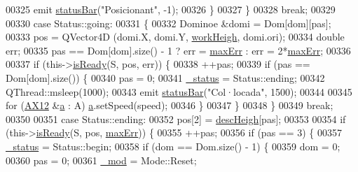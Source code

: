 \begin{DoxyCode}
00325                     emit \hyperlink{a00009_a3a3adc795d88624f86e13f2525e41106}{statusBar}(\textcolor{stringliteral}{"Posicionant"}, -1);
00326                 \}
00327             \}
00328                 \textcolor{keywordflow}{break};
00329                 
00330             \textcolor{keywordflow}{case} Status::going:
00331             \{
00332                 Dominoe &domi = Dom[dom][pas];
00333                 pos = QVector4D (domi.X, domi.Y, \hyperlink{a00009_a53758fdbbee450ab4cd5a3432725f056}{workHeigh}, domi.ori);
00334                 \textcolor{keywordtype}{double} err;
00335                 pas == Dom[dom].size() - 1 ? err = \hyperlink{a00009_a3ecb7da23afe91883435f239bd08ceb3}{maxErr} : err = 2*\hyperlink{a00009_a3ecb7da23afe91883435f239bd08ceb3}{maxErr};
00336                 
00337                 \textcolor{keywordflow}{if} (this->\hyperlink{a00009_a1d96ca800864243478463b0306ed74d7}{isReady}(S, pos, err)) \{
00338                     ++pas;
00339                     \textcolor{keywordflow}{if} (pas == Dom[dom].size()) \{
00340                         pas = 0;
00341                         \hyperlink{a00009_a8d2299f41165bffe1656df776f7f7528}{\_status} = Status::ending;
00342                         QThread::msleep(1000);
00343                         emit \hyperlink{a00009_a3a3adc795d88624f86e13f2525e41106}{statusBar}(\textcolor{stringliteral}{"Col·locada"}, 1500);
00344                         
00345                         \textcolor{keywordflow}{for} (\hyperlink{a00001}{AX12} &\hyperlink{a00009_a7dc3998d380d61406fe4485f9872edff}{a} : A) \hyperlink{a00009_a7dc3998d380d61406fe4485f9872edff}{a}.setSpeed(speed);
00346                     \}
00347                 \}
00348             \}   
00349                 \textcolor{keywordflow}{break};
00350                 
00351             \textcolor{keywordflow}{case} Status::ending:
00352                 pos[2] = \hyperlink{a00009_a9ca211d5d711c959689afd7fff5a897a}{descHeigh}[pas];
00353                 
00354                 \textcolor{keywordflow}{if} (this->\hyperlink{a00009_a1d96ca800864243478463b0306ed74d7}{isReady}(S, pos, \hyperlink{a00009_a3ecb7da23afe91883435f239bd08ceb3}{maxErr})) \{
00355                     ++pas;
00356                     \textcolor{keywordflow}{if} (pas == 3) \{
00357                         \hyperlink{a00009_a8d2299f41165bffe1656df776f7f7528}{\_status} = Status::begin;
00358                         \textcolor{keywordflow}{if} (dom == Dom.size() - 1) \{
00359                             dom = 0;
00360                             pas = 0;
00361                             \hyperlink{a00009_acdecea1688594d3ab7386a6db97dd90d}{\_mod} = Mode::Reset;

\end{DoxyCode}
